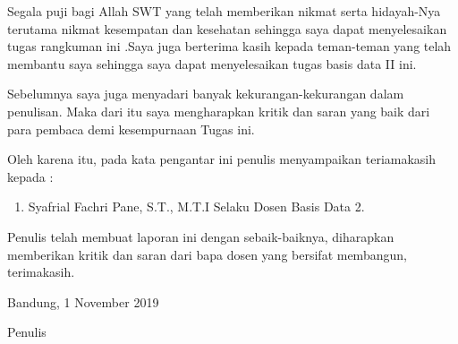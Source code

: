\begin{acknowledgements}
Segala puji bagi Allah SWT yang telah memberikan nikmat  serta hidayah-Nya terutama nikmat kesempatan dan kesehatan sehingga saya dapat menyelesaikan tugas rangkuman ini .Saya juga berterima kasih kepada teman-teman yang telah membantu saya sehingga saya dapat menyelesaikan tugas basis data II  ini.

Sebelumnya saya juga menyadari banyak kekurangan-kekurangan dalam penulisan. Maka dari itu saya mengharapkan kritik dan saran yang baik dari para pembaca demi kesempurnaan Tugas ini.


Oleh karena itu, pada kata pengantar ini penulis menyampaikan teriamakasih kepada :
\begin{enumerate}

\item  Syafrial Fachri Pane, S.T., M.T.I Selaku Dosen Basis Data 2.
\end{enumerate}

Penulis telah membuat laporan ini dengan sebaik-baiknya, diharapkan memberikan kritik dan saran dari bapa dosen yang bersifat membangun, terimakasih.

\begin{raggedleft}

Bandung, 1 November 2019

Penulis

\end{raggedleft}

\end{acknowledgements}